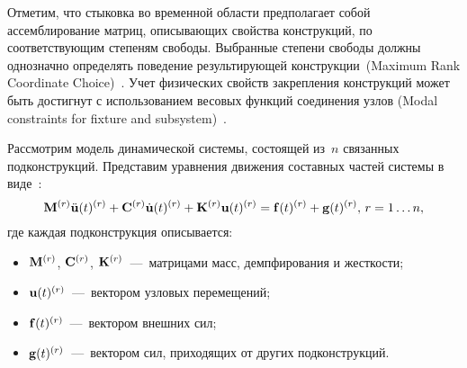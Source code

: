 Отметим, что стыковка во временной области предполагает собой ассемблирование матриц, описывающих свойства конструкций, по соответствующим степеням свободы. Выбранные степени свободы должны однозначно определять поведение результирующей конструкции~(Maximum Rank Coordinate Choice)~\cite{lib:coupling:Allen&Mayes}. Учет физических свойств закрепления конструкций может быть достигнут с использованием весовых функций соединения узлов (Modal constraints for fixture and subsystem)~\cite{lib:coupling:Allen}. 

Рассмотрим модель динамической системы, состоящей из~$ n $ связанных подконструкций. Представим уравнения движения составных частей системы в виде~\cite{lib:coupling:Klerk, lib:coupling:Brunetti}:
\begin{equation}
	\mathbf{M} ^ {(r)} \ddot{\mathbf{u}}(t) ^ {(r)} + \mathbf{C} ^ {(r)} \dot{\mathbf{u}}(t) ^ {(r)} + \mathbf{K} ^ {(r)} \mathbf{u}(t) ^ {(r)} = \mathbf{f}(t) ^ {(r)} + \mathbf{g}(t) ^ {(r)}, \, r = 1 \hdots n, \label{eq:motionSubstructure}
\end{equation}
где каждая подконструкция описывается:
\begin{itemize}
	\item $ \mathbf{M} ^ {(r)} $, $ \mathbf{C} ^ {(r)} $, $ \mathbf{K} ^ {(r)} $~---~матрицами масс, демпфирования и жесткости;
	\item $ \mathbf{u}(t) ^ {(r)} $~---~вектором узловых перемещений; 
	\item $ \mathbf{f}(t) ^ {(r)} $~---~вектором внешних сил; 
	\item $ \mathbf{g}(t) ^ {(r)} $~---~вектором сил, приходящих от других подконструкций. 
\end{itemize}

